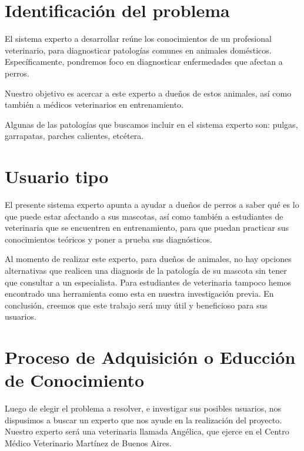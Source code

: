 \documentclass[a4paper,table,xcdraw]{article}
\begin{document}


\tableofcontents

\newpage

\section{Identificación del problema}
El sistema experto a desarrollar reúne los conocimientos de un profesional veterinario, para diagnosticar patologías comunes en animales domésticos. Específicamente, pondremos foco en diagnosticar enfermedades que afectan a perros.

Nuestro objetivo es acercar a este experto a dueños de estos animales, así como también a médicos veterinarios en entrenamiento. 

Algunas de las patologías que buscamos incluir en el sistema experto son: pulgas, garrapatas, parches calientes, etcétera.

\section{Usuario tipo}
El presente sistema experto apunta a ayudar a dueños de perros a saber qué es lo que puede estar afectando a sus mascotas, así como también a estudiantes de veterinaria que se encuentren en entrenamiento, para que puedan practicar sus conocimientos teóricos y poner a prueba sus diagnósticos.

Al momento de realizar este experto, para dueños de animales, no hay opciones alternativas que realicen una diagnosis de la patología de su mascota sin tener que consultar a un especialista. Para estudiantes de veterinaria tampoco hemos encontrado una herramienta como esta en nuestra investigación previa.
En conclusión, creemos que este trabajo será muy útil y beneficioso para sus usuarios.

\section{Proceso de Adquisición o Educción de
Conocimiento}
Luego de elegir el problema a resolver, e investigar sus posibles usuarios, nos dispusimos a buscar un experto que nos ayude en la realización del proyecto.
Nuestro experto será una veterinaria llamada Angélica, que ejerce en el Centro Médico Veterinario Martínez de Buenos Aires.
\end{document}
